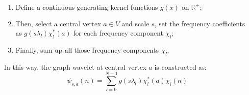 \begin{enumerate}
\item Define a continuous generating kernel functions $g(x)$ on $\mathbb{R}^+$;
\item Then, select a central vertex $a \in {V}$ and scale $s$, set the frequency coefficients as $g(s\lambda_l)\chi^*_l(a)$ for each frequency component $\chi_l$;
\item Finally, sum up all those frequency components $\chi_l$.
\end{enumerate}
In this way, the graph wavelet at central vertex $a$ is constructed as:
\begin{equation}
\label{eq:graphwaveletdefinition}
\psi_{s,a}(n) = \sum\limits_{l=0}^{N-1}g(s\lambda_l)\chi_l^*(a)\chi_l(n)
\end{equation}


